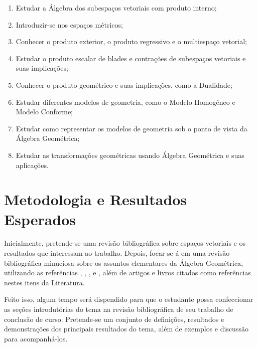 \documentclass[11pt]{article}
\begin{document}
\begin{enumerate}[(1)]

\item Estudar a Álgebra dos subespaços vetoriais com produto interno;

\item Introduzir-se nos espaços métricos;

\item Conhecer o produto exterior, o produto regressivo e o multiespaço vetorial;

\item Estudar o produto escalar de blades e contrações de subespaços vetoriais e suas implicações;

\item Conhecer o produto geométrico e suas implicações, como a Dualidade;

\item Estudar diferentes modelos de geometria, como o Modelo Homogêneo e Modelo Conforme;

\item Estudar como representar os modelos de geometria sob o ponto de vista da Álgebra Geométrica;

\item Estudar as transformações geométricas usando Álgebra Geométrica e suas aplicações.

\end{enumerate}

\section{Metodologia e Resultados Esperados}
 
Inicialmente, pretende-se uma revisão bibliográfica sobre espaços vetoriais e os resultados que interessam ao trabalho. Depois, focar-se-á em uma revisão bibliográfica minuciosa sobre os assuntos elementares da Álgebra Geométrica, utilizando as referências \cite{sommerGeometric}, \cite{leandro2017algebra}, \cite{dorst2010geometric}, \cite{lundholm2009clifford} e \cite{lounestoClifford}, além de artigos e livros citados como referências nestes itens da Literatura. 

Feito isso, algum tempo será dispendido para que o estudante possa confeccionar as seções introdutórias do tema na revisão bibliográfica de seu trabalho de conclusão de curso. Pretende-se um conjunto de definições, resultados e demonstrações dos principais resultados do tema, além de exemplos e discussão para acompanhá-los.
\\
\end{document}
